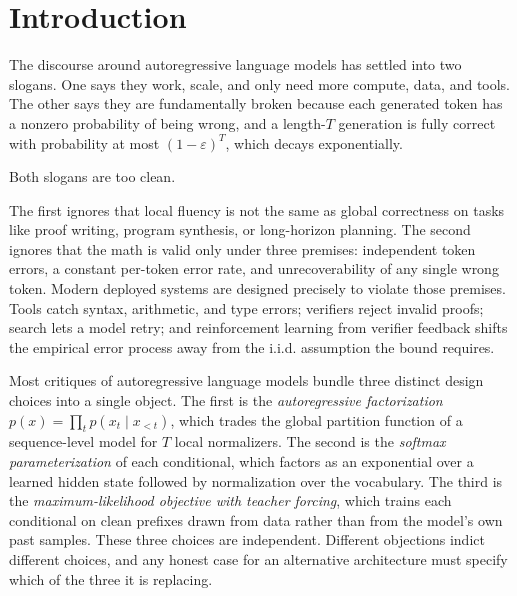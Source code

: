 
\section{Introduction}
\label{sec:introduction}

The discourse around autoregressive language models has settled into two slogans.
One says they work, scale, and only need more compute, data, and tools.
The other says they are fundamentally broken because each generated token has a nonzero probability of being wrong, and a length-$T$ generation is fully correct with probability at most $(1-\varepsilon)^T$, which decays exponentially.

Both slogans are too clean.

The first ignores that local fluency is not the same as global correctness on tasks like proof writing, program synthesis, or long-horizon planning.
The second ignores that the math is valid only under three premises: independent token errors, a constant per-token error rate, and unrecoverability of any single wrong token.
Modern deployed systems are designed precisely to violate those premises.
Tools catch syntax, arithmetic, and type errors;
verifiers reject invalid proofs;
search lets a model retry;
and reinforcement learning from verifier feedback shifts the empirical error process away from the i.i.d. assumption the bound requires.

Most critiques of autoregressive language models bundle three distinct design choices into a single object.
The first is the \emph{autoregressive factorization} $p(x) = \prod_t p(x_t \mid x_{<t})$, which trades the global partition function of a sequence-level model for $T$ local normalizers.
The second is the \emph{softmax parameterization} of each conditional, which factors as an exponential over a learned hidden state followed by normalization over the vocabulary.
The third is the \emph{maximum-likelihood objective with teacher forcing}, which trains each conditional on clean prefixes drawn from data rather than from the model's own past samples.
These three choices are independent.
Different objections indict different choices, and any honest case for an alternative architecture must specify which of the three it is replacing.


